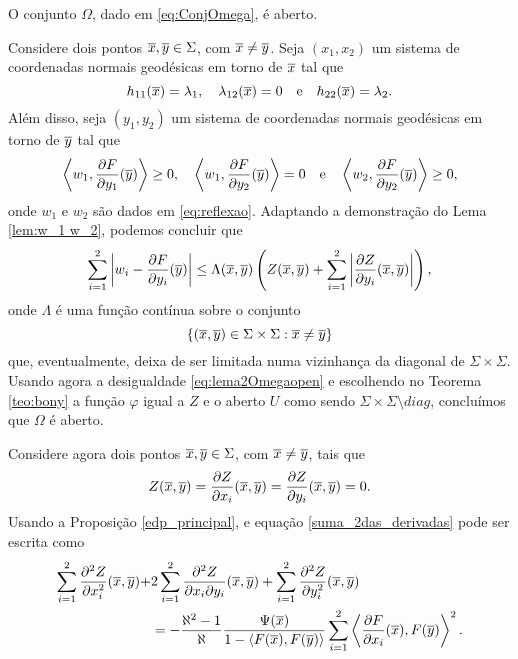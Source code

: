 \begin{lema}
O conjunto $\Omega$, dado em \eqref{eq:ConjOmega}, \'e aberto.
\end{lema}
\begin{demonstracao}
Considere dois pontos $\overline{x},\overline{y}\in\Sigma$, com $\overline{x}\neq\overline{y}$. Seja
$(x_1,x_2)$ um sistema de coordenadas normais geod\'esicas em
torno de $\overline{x}$ tal que
\[
h_{11}(\overline{x})=\lambda_1, \quad \lambda_{12}(\overline{x})=0
\quad\mbox{e}\quad h_{22}(\overline{x})=\lambda_2. 
\]
Al\'em disso, seja $(y_1,y_2)$ um sistema de coordenadas normais 
geod\'esicas em torno de $\overline{y}$ tal que
\begin{equation*}
\left\langle w_1, \frac{\partial F}{\partial y_1}(\overline{y}) \right\rangle \geq 0, 
\quad 
\left\langle w_1, \frac{\partial F}{\partial y_2}(\overline{y}) \right\rangle = 0 
\quad \text{e} \quad 
\left\langle w_2, \frac{\partial F}{\partial y_2}(\overline{y}) \right\rangle \geq 0,
\end{equation*}
onde $w_1$ e $w_2$ s\~ao dados em \eqref{eq:reflexao}. Adaptando
a demonstra\c c\~ao do Lema \ref{lem:w_1 w_2}, podemos concluir
que
\[
\sum_{i=1}^2\left| w_i-\frac{\partial F}{\partial y_i}(\overline{y})\right| \leq
\Lambda(\overline{x},\overline{y})\left(Z(\overline{x},\overline{y})+\sum_{i=1}^2
\left|\frac{\partial Z}{\partial y_i}(\overline{x},\overline{y})\right|\right),
\]
onde $\Lambda$ \'e uma fun\c c\~ao cont\'inua sobre o conjunto
\[
\{(\overline{x},\overline{y})\in\Sigma\times\Sigma:\overline{x}\neq\overline{y}\}
\]
que, eventualmente, deixa de ser limitada numa vizinhan\c ca
da diagonal de $\Sigma\times\Sigma$. Usando agora a desigualdade
\eqref{eq:lema2Omegaopen} e escolhendo no Teorema \ref{teo:bony}
a fun\c c\~ao $\varphi$ igual a $Z$ e o aberto $U$ como sendo
$\Sigma\times\Sigma\setminus diag$, conclu\'imos que $\Omega$
\'e aberto.
\end{demonstracao}


Considere agora dois pontos $\overline{x},\overline{y}\in\Sigma$, com $\overline{x}\neq\overline{y}$,
tais que
\[
Z(\overline{x},\overline{y}) = \frac{\partial Z}{\partial x_i}(\overline{x},\overline{y}) 
= \frac{\partial Z}{\partial y_i}(\overline{x},\overline{y}) = 0.
\]
Usando a Proposi\c c\~ao \ref{edp_principal}, e equação
\eqref{suma_2das_derivadas} pode ser escrita como
\begin{equation} \label{suma_2da_der_aleph}
\begin{aligned}
\sum_{i=1}^2 \frac{\partial^2 Z}{\partial x_i^2}(\overline{x},\overline{y}) + & 
2 \sum_{i=1}^2 \frac{\partial^2 Z}{\partial x_i \partial y_i}(\overline{x},\overline{y}) + 
\sum_{i=1}^2 \frac{\partial^2 Z}{\partial y_i^2}(\overline{x},\overline{y})  \\
& = - 
\frac{\aleph^2 - 1}{\aleph} \frac{\Psi(\overline{x})}{1 - \langle F(\overline{x}), 
F(\overline{y}) \rangle} \sum_{i=1}^2 \left\langle \frac{\partial F}
{\partial x_i}(\overline{x}), F(\overline{y}) \right\rangle^2.
\end{aligned}
\end{equation}



